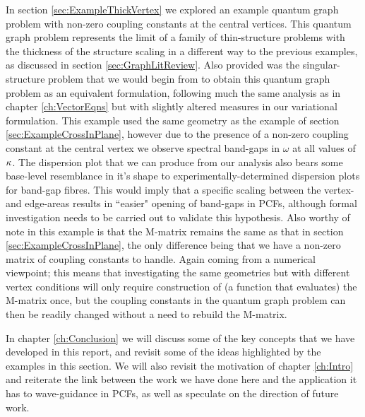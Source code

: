 In section \ref{sec:ExampleThickVertex} we explored an example quantum graph problem with non-zero coupling constants at the central vertices.
This quantum graph problem represents the limit of a family of thin-structure problems with the thickness of the structure scaling in a different way to the previous examples, as discussed in section \ref{sec:GraphLitReview}.
Also provided was the singular-structure problem that we would begin from to obtain this quantum graph problem as an equivalent formulation, following much the same analysis as in chapter \ref{ch:VectorEqns} but with slightly altered measures in our variational formulation.
This example used the same geometry as the example of section \ref{sec:ExampleCrossInPlane}, however due to the presence of a non-zero coupling constant at the central vertex we observe spectral band-gaps in $\omega$ at all values of $\kappa$.
The dispersion plot that we can produce from our analysis also bears some base-level resemblance in it's shape to experimentally-determined dispersion plots for band-gap fibres.
This would imply that a specific scaling between the vertex- and edge-areas results in ``easier" opening of band-gaps in PCFs, although formal investigation needs to be carried out to validate this hypothesis.
Also worthy of note in this example is that the M-matrix remains the same as that in section \ref{sec:ExampleCrossInPlane}, the only difference being that we have a non-zero matrix of coupling constants to handle.
Again coming from a numerical viewpoint; this means that investigating the same geometries but with different vertex conditions will only require construction of (a function that evaluates) the M-matrix once, but the coupling constants in the quantum graph problem can then be readily changed without a need to rebuild the M-matrix. \newline

In chapter \ref{ch:Conclusion} we will discuss some of the key concepts that we have developed in this report, and revisit some of the ideas highlighted by the examples in this section.
We will also revisit the motivation of chapter \ref{ch:Intro} and reiterate the link between the work we have done here and the application it has to wave-guidance in PCFs, as well as speculate on the direction of future work.